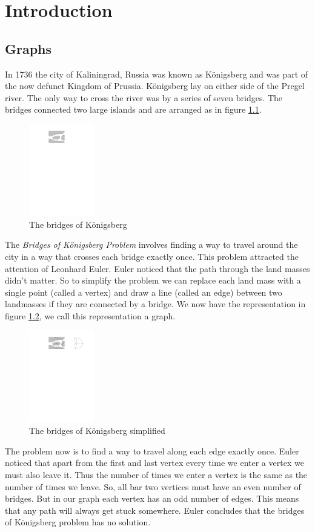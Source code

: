 \chapter{Introduction}\label{chpt:into}

\section{Graphs}
In 1736 the city of Kaliningrad, Russia was known as K\"{o}nigsberg and was part of the now defunct Kingdom of Prussia. K\"{o}nigsberg lay on either side of the Pregel river. The only way to cross the river was by a series of seven bridges. The bridges connected two large islands and are arranged as in figure \ref{fig:bridges1}. 
\begin{figure}[h]
    \centering
    \includegraphics[height=40mm]{images/161-fig26}  %
    \caption{The bridges of K\"{o}nigsberg}
    \label{fig:bridges1}
\end{figure}
The \textit{Bridges of K\"{o}nigsberg Problem} involves finding a way to travel around the city in a way that crosses each bridge exactly once. This problem attracted the attention of Leonhard Euler. Euler noticed that the path through the land masses didn't matter. So to simplify the problem we can replace each land mass with a single point (called a vertex) and draw a line (called an edge) between two landmasses if they are connected by a bridge. We now have the representation in figure \ref{fig:bridges2}, we call this representation a graph.
\begin{figure} [h]
    \centering
        \includegraphics[height=40mm]{images/161-fig27}
    \caption{The bridges of K\"{o}nigsberg simplified}
    \label{fig:bridges2}
\end{figure} 
The problem now is to find a way to travel along each edge exactly once. Euler noticed that apart from the first and last vertex every time we enter a vertex we must also leave it. Thus the number of times we enter a vertex is the same as the number of times we leave. So, all bar two vertices must have an even number of bridges. But in our graph each vertex has an odd number of edges. This means that any path will always get stuck somewhere. Euler concludes that the bridges of K\"{o}nigsberg problem has no solution.

